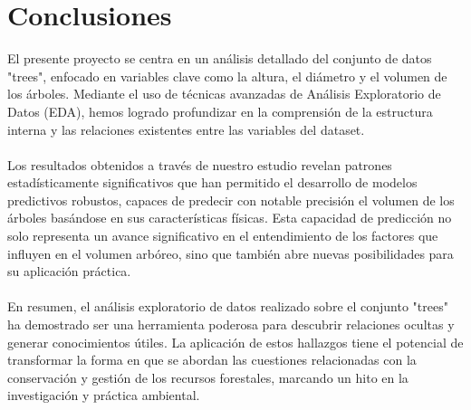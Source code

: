 \documentclass{article}
\begin{document}
\section{Conclusiones}
El presente proyecto se centra en un análisis detallado del conjunto de datos "trees", enfocado en variables clave como la altura, el diámetro y el volumen de los árboles. Mediante el uso de técnicas avanzadas de Análisis Exploratorio de Datos (EDA), hemos logrado profundizar en la comprensión de la estructura interna y las relaciones existentes entre las variables del dataset.\\ \\ 
Los resultados obtenidos a través de nuestro estudio revelan patrones estadísticamente significativos que han permitido el desarrollo de modelos predictivos robustos, capaces de predecir con notable precisión el volumen de los árboles basándose en sus características físicas. Esta capacidad de predicción no solo representa un avance significativo en el entendimiento de los factores que influyen en el volumen arbóreo, sino que también abre nuevas posibilidades para su aplicación práctica.\\ \\
En resumen, el análisis exploratorio de datos realizado sobre el conjunto "trees" ha demostrado ser una herramienta poderosa para descubrir relaciones ocultas y generar conocimientos útiles. La aplicación de estos hallazgos tiene el potencial de transformar la forma en que se abordan las cuestiones relacionadas con la conservación y gestión de los recursos forestales, marcando un hito en la investigación y práctica ambiental.
\clearpage
\end{document}

